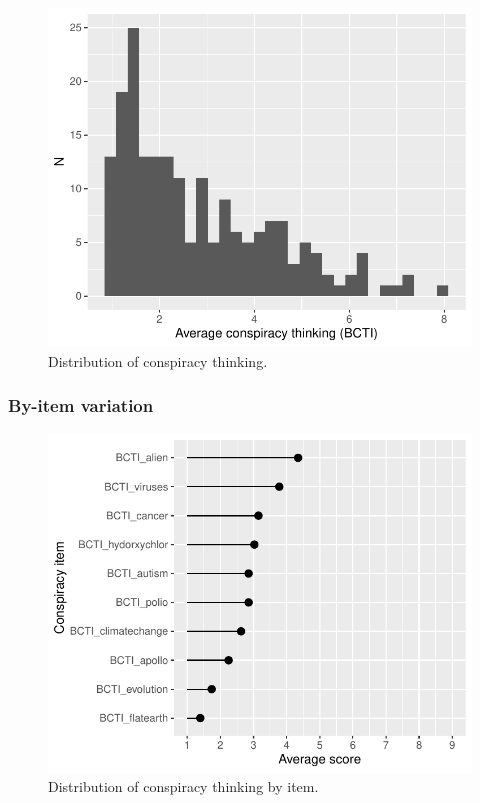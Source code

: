 \documentclass[
  doc,floatsintext]{apa6}
\begin{document}
\begin{figure}
\centering
\includegraphics{output/figures/exp1-conspiracy-distribution.pdf}
\caption{\label{fig:exp1-conspiracy-distribution}Distribution of conspiracy thinking.}
\end{figure}

\subsubsection{By-item variation}\label{by-item-variation}



\begin{figure}
\centering
\includegraphics{output/figures/exp1-conspiracy-items.pdf}
\caption{\label{fig:exp1-conspiracy-items}Distribution of conspiracy thinking by item.}
\end{figure}
\end{document}
